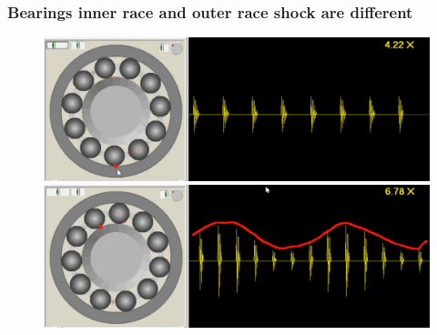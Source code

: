 \documentclass{beamer}
\begin{document}




\begin{frame}
	\frametitle{Bearings inner race and outer race shock are different}
	\begin{figure}[H]
		\centering
		\includegraphics[width=0.8\linewidth]{outer-race2}
		\includegraphics[width=0.8\linewidth]{inner-race2}
	\end{figure}
\end{frame}

\end{document}

